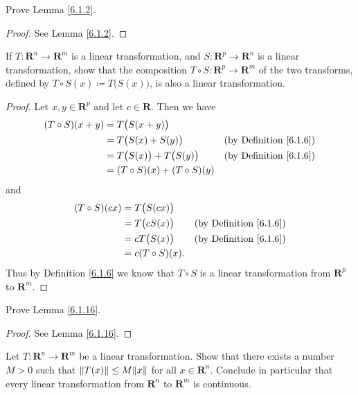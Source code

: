 \exercisesection

\begin{exercise}\label{ex 6.1.1}
    Prove Lemma \ref{6.1.2}.
\end{exercise}

\begin{proof}
    See Lemma \ref{6.1.2}.
\end{proof}

\begin{exercise}\label{ex 6.1.2}
    If \(T : \mathbf{R}^n \to \mathbf{R}^m\) is a linear transformation, and \(S : \mathbf{R}^p \to \mathbf{R}^n\) is a linear transformation, show that the composition \(T \circ S : \mathbf{R}^p \to \mathbf{R}^m\) of the two transforms, defined by \(T \circ S(x) \coloneqq T\big(S(x)\big)\), is also a linear transformation.
\end{exercise}

\begin{proof}
    Let \(x, y \in \mathbf{R}^p\) and let \(c \in \mathbf{R}\).
    Then we have
    \begin{align*}
        (T \circ S)(x + y) & = T\big(S(x + y)\big)                                                    \\
                           & = T\big(S(x) + S(y)\big)            & \text{(by Definition \ref{6.1.6})} \\
                           & = T\big(S(x)\big) + T\big(S(y)\big) & \text{(by Definition \ref{6.1.6})} \\
                           & = (T \circ S)(x) + (T \circ S)(y)
    \end{align*}
    and
    \begin{align*}
        (T \circ S)(cx) & = T\big(S(cx)\big)                                       \\
                        & = T\big(c S(x)\big) & \text{(by Definition \ref{6.1.6})} \\
                        & = c T\big(S(x)\big) & \text{(by Definition \ref{6.1.6})} \\
                        & = c (T \circ S)(x).
    \end{align*}
    Thus by Definition \ref{6.1.6} we know that \(T \circ S\) is a linear transformation from \(\mathbf{R}^p\) to \(\mathbf{R}^m\).
\end{proof}

\begin{exercise}\label{ex 6.1.3}
    Prove Lemma \ref{6.1.16}.
\end{exercise}

\begin{proof}
    See Lemma \ref{6.1.16}.
\end{proof}

\begin{exercise}\label{ex 6.1.4}
    Let \(T : \mathbf{R}^n \to \mathbf{R}^m\) be a linear transformation.
    Show that there exists a number \(M > 0\) such that \(\norm*{T(x)} \leq M \norm*{x}\) for all \(x \in \mathbf{R}^n\).
    Conclude in particular that every linear transformation from \(\mathbf{R}^n\) to \(\mathbf{R}^m\) is continuous.
\end{exercise}
